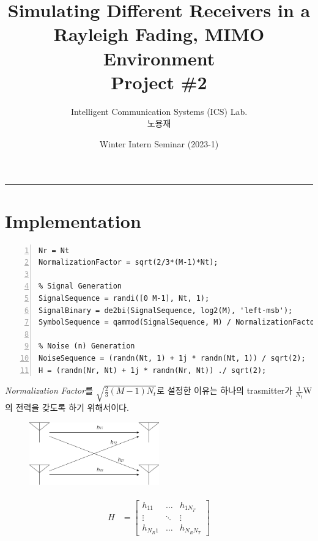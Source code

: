 \documentclass{article}
\title{Simulating Different Receivers in a \\Rayleigh Fading, MIMO Environment\\
\large Project \#2}
\author{Intelligent Communication Systems (ICS) Lab.\\노용재}
\date{Winter Intern Seminar (2023-1)}
\begin{document}
\maketitle
\tableofcontents
\vspace{0.5cm}
\hrule
\vspace{0.5cm}

\section{Implementation}
\begin{lstlisting}[style=Matlab-editor, frame=single, numbers=left,]
% Environment Variables
Nr = Nt
NormalizationFactor = sqrt(2/3*(M-1)*Nt);

% Signal Generation
SignalSequence = randi([0 M-1], Nt, 1);
SignalBinary = de2bi(SignalSequence, log2(M), 'left-msb');
SymbolSequence = qammod(SignalSequence, M) / NormalizationFactor;

% Noise (n) Generation
NoiseSequence = (randn(Nt, 1) + 1j * randn(Nt, 1)) / sqrt(2);
H = (randn(Nr, Nt) + 1j * randn(Nr, Nt)) ./ sqrt(2);
\end{lstlisting}
\textsl{Normalization Factor}를 $\sqrt{\frac{2}{3}(M-1)N_t}$로 설정한 이유는 하나의 trasmitter가 $\frac{1}{N_t}$W의 전력을 갖도록 하기 위해서이다.
\begin{figure}[H]
	\centerline{\includegraphics[width=0.5\textwidth]{antenna.png}}
	\caption{}
\end{figure}
\begin{gather}
	\begin{split}
		H &=
		\begin{bmatrix}
		h_{11} & \hdots & h_{1N_T}\\
		\vdots & \ddots & \vdots\\
		h_{N_R1} & \hdots & h_{N_R N_T}
		\end{bmatrix}
	\end{split}
\end{gather}
\end{document}
